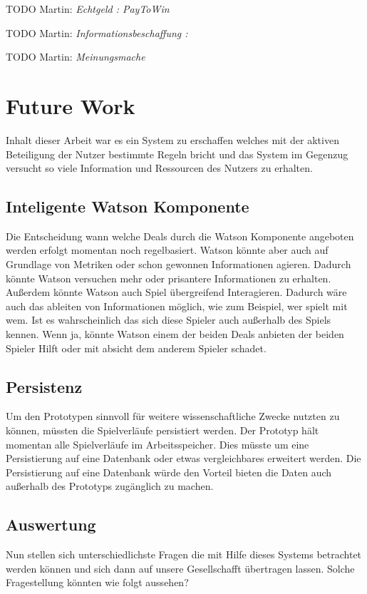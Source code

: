 \documentclass[german]{cgspaper} %
\newcommand{\todo}[1]{\textit{#1}}
\newcommand{\Martin}[1]{\textcolor{colorMartin}{TODO Martin:} \todo{#1} }
\begin{document}
\Martin{Echtgeld : PayToWin}

\Martin{Informationsbeschaffung : }

\Martin{Meinungsmache}

\section{Future Work}

Inhalt dieser Arbeit war es ein System zu erschaffen welches mit der aktiven Beteiligung der Nutzer bestimmte Regeln bricht und das System im Gegenzug versucht so viele Information und Ressourcen des Nutzers zu erhalten.

\subsection{Inteligente Watson Komponente}

Die Entscheidung wann welche Deals durch die Watson Komponente angeboten werden erfolgt momentan noch regelbasiert.
Watson könnte aber auch auf Grundlage von Metriken oder schon gewonnen Informationen agieren.
Dadurch könnte Watson versuchen mehr oder prisantere Informationen zu erhalten.
Außerdem könnte Watson auch Spiel übergreifend Interagieren.
Dadurch wäre auch das ableiten von Informationen möglich, wie zum Beispiel, wer spielt mit wem.
Ist es wahrscheinlich das sich diese Spieler auch außerhalb des Spiels kennen.
Wenn ja, könnte Watson einem der beiden Deals anbieten der beiden Spieler Hilft oder mit absicht dem anderem Spieler schadet.

\subsection{Persistenz}

Um den Prototypen sinnvoll für weitere wissenschaftliche Zwecke nutzten zu können, müssten die Spielverläufe persistiert werden.
Der Prototyp hält momentan alle Spielverläufe im Arbeitsspeicher.
Dies müsste um eine Persistierung auf eine Datenbank oder etwas vergleichbares erweitert werden.
Die Persistierung auf eine Datenbank würde den Vorteil bieten die Daten auch außerhalb des Prototyps zugänglich zu machen.

\subsection{Auswertung}

Nun stellen sich unterschiedlichste Fragen die mit Hilfe dieses Systems betrachtet werden können und sich dann auf unsere Gesellschafft übertragen lassen.
Solche Fragestellung könnten wie folgt aussehen?
\end{document}
